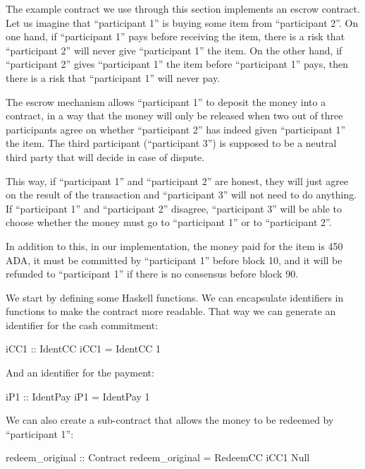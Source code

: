 \documentclass[
      acmsmall
    , screen
  ]{acmart}
\begin{document}
The example contract we use through this section implements an escrow contract. Let us imagine that ``participant 1'' 
is buying some item from ``participant 2''. On one hand, if ``participant 1'' pays before receiving the item, there 
is a risk that ``participant 2'' will never give ``participant 1'' the item. On the other hand, if ``participant 2'' 
gives ``participant 1'' the item before ``participant 1'' pays, then there is a risk that ``participant 1'' will never 
pay.

The escrow mechanism allows ``participant 1'' to deposit the money into a contract, in a way that the money will only 
be released when two out of three participants agree on whether ``participant 2'' has indeed given ``participant 1'' 
the item. The third participant (``participant 3'') is supposed to be a neutral third party that will decide in case of 
dispute.

This way, if ``participant 1'' and ``participant 2'' are honest, they will just agree on the result of the transaction 
and ``participant 3'' will not need to do anything. If ``participant 1'' and ``participant 2'' disagree, ``participant 
3'' will be able to choose whether the money must go to ``participant 1'' or to ``participant 2''.

In addition to this, in our implementation, the money paid for the item is 450 ADA, it must be committed by 
``participant 1'' before block 10, and it will be refunded to ``participant 1'' if there is no consensus before block 
90.

We start by defining some Haskell functions. We can encapsulate identifiers in functions to make the contract more 
readable. That way we can generate an identifier for the cash commitment:

\begin{haskellcode}
iCC1 :: IdentCC
iCC1 = IdentCC 1
\end{haskellcode}

And an identifier for the payment:

\begin{haskellcode}
iP1 :: IdentPay
iP1 = IdentPay 1
\end{haskellcode}

We can also create a sub-contract that allows the money to be redeemed by ``participant 1'':

\begin{haskellcode}
redeem_original :: Contract
redeem_original = RedeemCC iCC1 Null
\end{haskellcode}
\end{document}
